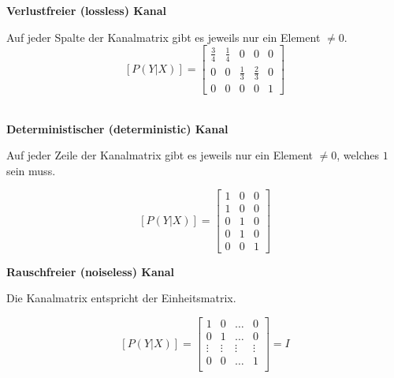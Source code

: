 \textbf{Verlustfreier (lossless) Kanal} \\
\begin{minipage}{14cm}
	Auf jeder Spalte der Kanalmatrix gibt es jeweils nur ein  Element $\neq 0$. \\

	$$ [P(Y | X)] = \begin{bmatrix}
              \frac34 & \frac14 & 0 & 0 & 0 \\
              0 & 0 & \frac13 & \frac23 & 0 \\
              0 & 0 & 0 & 0 & 1
           \end{bmatrix}$$ \\
\end{minipage}
\begin{minipage}{5cm}
\begin{center}
\end{center}
\end{minipage}

\textbf{Deterministischer (deterministic) Kanal} \\
\begin{minipage}{14cm}
	Auf jeder Zeile der Kanalmatrix gibt es jeweils nur ein  Element $\neq 0$, welches $1$ sein
	muss.

	$$ [P(Y | X)] = \begin{bmatrix}
           		1 & 0 & 0 \\
           		1 & 0 & 0 \\
           		0 & 1 & 0 \\
           		0 & 1 & 0 \\
           		0 & 0 & 1
           \end{bmatrix}$$
\end{minipage}
\begin{minipage}{5cm}
\begin{center}
\end{center}
\end{minipage}

\textbf{Rauschfreier (noiseless) Kanal} \\
\begin{minipage}{14cm}
	Die Kanalmatrix entspricht der Einheitsmatrix.

	$$ [P(Y | X)] = \begin{bmatrix}
           		1 & 0 & \ldots & 0\\
           		0 & 1 & \ldots & 0\\
           		\vdots & \vdots & \vdots & \vdots \\
           		0 & 0 & \ldots & 1\\
           \end{bmatrix} = I$$ \\
\end{minipage}
\begin{minipage}{4cm}
\begin{center}
\end{center}
\end{minipage}

